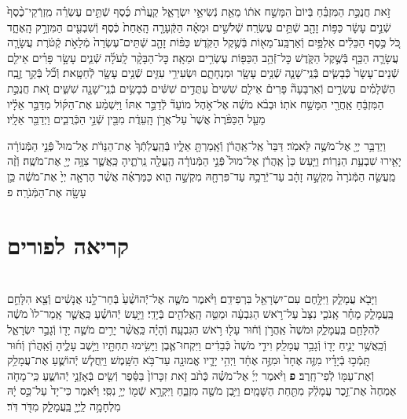 \documentclass[twoside, openany, parskip=half, 11pt]{book}
\begin{document}
\begin{footnotesize}
\begin{multicols}{2}
זֹ֣את חֲנֻכַּ֣ת הַמִּזְבֵּ֗חַ בְּֿיוֹם֙ הִמָּשַׁ֣ח אֹת֔וֹ מֵאֵ֖ת נְֿשִׂיאֵ֣י יִשְׂרָאֵ֑ל קַֽעֲרֹ֨ת כֶּ֜סֶף שְֿׁתֵּ֣ים עֶשְׂרֵ֗ה מִֽזְרְֿקֵי־כֶ֨סֶף֙ שְֿׁנֵ֣ים עָשָׂ֔ר כַּפּ֥וֹת זָהָ֖ב שְֿׁתֵּ֥ים עֶשְׂרֵֽה׃ שְֿׁלֹשִׁ֣ים וּמֵאָ֗ה הַקְּֿעָרָ֤ה הָֽאַחַת֙ כֶּ֔סֶף וְֿשִׁבְעִ֖ים הַמִּזְרָ֣ק הָֽאֶחָ֑ד כֹּ֚ל כֶּ֣סֶף הַכֵּלִ֔ים אַלְפַּ֥יִם וְֿאַרְבַּֽע־מֵא֖וֹת בְּֿשֶׁ֥קֶל הַקֹּֽדֶשׁ׃ כַּפּ֨וֹת זָהָ֤ב שְֿׁתֵּים־עֶשְׂרֵה֙ מְֿלֵאֹ֣ת קְֿטֹ֔רֶת עֲשָׂרָ֧ה עֲשָׂרָ֛ה הַכַּ֖ף בְּֿשֶׁ֣קֶל הַקֹּ֑דֶשׁ כׇּל־זְֿהַ֥ב הַכַּפּ֖וֹת עֶשְׂרִ֥ים וּמֵאָֽה׃ כׇּל־הַבָּקָ֨ר לָֽעֹלָ֜ה שְֿׁנֵ֧ים עָשָׂ֣ר פָּרִ֗ים אֵילִ֤ם שְֿׁנֵים־עָשָׂר֙ כְּֿבָשִׂ֧ים בְּֿנֵֽי־שָׁנָ֛ה שְֿׁנֵ֥ים עָשָׂ֖ר וּמִנְחָתָ֑ם וּשְׂעִירֵ֥י עִזִּ֛ים שְֿׁנֵ֥ים עָשָׂ֖ר לְֿחַטָּֽאת׃ וְֿכֹ֞ל בְּֿקַ֣ר זֶ֣בַֽח הַשְּֿׁלָמִ֗ים עֶשְׂרִ֣ים וְֿאַרְבָּעָה֘ פָּרִים֒ אֵילִ֤ם שִׁשִּׁים֙ עַתֻּדִ֣ים שִׁשִּׁ֔ים כְּֿבָשִׂ֥ים בְּֿנֵֽי־שָׁנָ֖ה שִׁשִּׁ֑ים זֹ֚את חֲנֻכַּ֣ת הַמִּזְבֵּ֔חַ אַֽחֲרֵ֖י הִמָּשַׁ֥ח אֹתֽוֹ׃ וּבְבֹ֨א מֹשֶׁ֜ה אֶל־אֹ֣הֶל מוֹעֵד֘ לְֿדַבֵּ֣ר אִתּוֹ֒ וַיִּשְׁמַ֨ע אֶת־הַקּ֜וֹל מִדַּבֵּ֣ר אֵלָ֗יו מֵעַ֤ל הַכַּפֹּ֨רֶת֙ אֲשֶׁר֙ עַל־אֲרֹ֣ן הָֽעֵדֻ֔ת מִבֵּ֖ין שְֿׁנֵ֣י הַכְּֿרֻבִ֑ים וַיְדַבֵּ֖ר אֵלָֽיו׃

וַיְדַבֵּ֥ר יְיָ֖ אֶל־מֹשֶׁ֥ה לֵּאמֹֽר׃ דַּבֵּר֙ אֶֽל־אַֽהֲרֹ֔ן וְֿאָֽמַרְתָּ֖ אֵלָ֑יו בְּֿהַֽעֲלֹֽתְֿךָ֙ אֶת־הַנֵּרֹ֔ת אֶל־מוּל֙ פְּֿנֵ֣י הַמְּֿנוֹרָ֔ה יָאִ֖ירוּ שִׁבְעַ֥ת הַנֵּרֽוֹת׃ וַיַּ֤עַשׂ כֵּן֙ אַֽהֲרֹ֔ן אֶל־מוּל֙ פְּֿנֵ֣י הַמְּֿנוֹרָ֔ה הֶֽעֱלָ֖ה נֵֽרֹתֶ֑יהָ כַּֽאֲשֶׁ֛ר צִוָּ֥ה יְיָ֖ אֶת־מֹשֶֽׁה׃ וְֿזֶ֨ה מַֽעֲשֵׂ֤ה הַמְּֿנֹרָה֙ מִקְשָׁ֣ה זָהָ֔ב עַד־יְֿרֵכָ֥הּ עַד־פִּרְחָ֖הּ מִקְשָׁ֣ה הִ֑וא כַּמַּרְאֶ֗ה אֲשֶׁ֨ר הֶרְאָ֤ה יְיָ֙ אֶת־מֹשֶׁ֔ה כֵּ֥ן עָשָׂ֖ה אֶת־הַמְּֿנֹרָֽה׃ פ

\end{multicols}

\section[פורים]{קריאה לפורים}


\begin{multicols}{2}
\\
וַיָּבֹ֖א עֲמָלֵ֑ק וַיִּלָּ֥חֶם עִם־יִשְׂרָאֵ֖ל בִּרְפִידִֽם׃ וַיֹּ֨אמֶר מֹשֶׁ֤ה אֶל־יְֿהוֹשֻׁ֨עַ֙ בְּֿחַר־לָ֣נוּ אֲנָשִׁ֔ים וְֿצֵ֖א הִלָּחֵ֣ם בַּֽעֲמָלֵ֑ק מָחָ֗ר אָֽנֹכִ֤י נִצָּב֙ עַל־רֹ֣אשׁ הַגִּבְעָ֔ה וּמַטֵּ֥ה הָֽאֱלֹהִ֖ים בְּֿיָדִֽי׃ וַיַּ֣עַשׂ יְֿהוֹשֻׁ֗עַ כַּֽאֲשֶׁ֤ר אָֽמַר־לוֹ֙ מֹשֶׁ֔ה לְֿהִלָּחֵ֖ם בַּֽעֲמָלֵ֑ק וּמֹשֶׁה֙ אַֽהֲרֹ֣ן וְֿח֔וּר עָל֖וּ רֹ֥אשׁ הַגִּבְעָֽה׃ 
וְֿהָיָ֗ה כַּֽאֲשֶׁ֨ר יָרִ֥ים מֹשֶׁ֛ה יָד֖וֹ וְֿגָבַ֣ר יִשְׂרָאֵ֑ל וְֿכַֽאֲשֶׁ֥ר יָנִ֛יחַ יָד֖וֹ וְֿגָבַ֥ר עֲמָלֵֽק׃ וִידֵ֤י מֹשֶׁה֙ כְּֿבֵדִ֔ים וַיִּקְחוּ־אֶ֛בֶן וַיָּשִׂ֥ימוּ תַחְתָּ֖יו וַיֵּ֣שֶׁב עָלֶ֑יהָ וְֿאַֽהֲרֹ֨ן וְֿח֜וּר תָּֽמְֿכ֣וּ בְֿיָדָ֗יו מִזֶּ֤ה אֶחָד֙ וּמִזֶּ֣ה אֶחָ֔ד וַיְהִ֥י יָדָ֛יו אֱמוּנָ֖ה עַד־בֹּ֥א הַשָּֽׁמֶשׁ׃ וַיַּֽחֲל֧שׁ יְֿהוֹשֻׁ֛עַ אֶת־עֲמָלֵ֥ק וְֿאֶת־עַמּ֖וֹ לְֿפִי־חָֽרֶב׃ \textbf{פ}
וַיֹּ֨אמֶר יְיָ֜ אֶל־מֹשֶׁ֗ה כְּֿתֹ֨ב זֹ֤את זִכָּרוֹן֙ בַּסֵּ֔פֶר וְֿשִׂ֖ים בְּֿאָזְֿנֵ֣י יְֿהוֹשֻׁ֑עַ כִּֽי־מָחֹ֤ה אֶמְחֶה֙ אֶת־זֵ֣כֶר עֲמָלֵ֔ק מִתַּ֖חַת הַשָּׁמָֽיִם׃ וַיִּ֥בֶן מֹשֶׁ֖ה מִזְבֵּ֑חַ וַיִּקְרָ֥א שְֿׁמ֖וֹ יְיָ֥ נִסִּֽי׃ וַיֹּ֗אמֶר כִּי־יָד֙ עַל־כֵּ֣ס יָ֔הּ מִלְחָמָ֥ה לַֽיְיָ֖ בַּֽעֲמָלֵ֑ק מִדֹּ֖ר דֹּֽר׃


\end{multicols}
\end{footnotesize}
\end{document}
